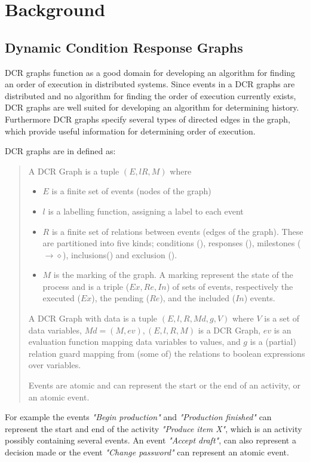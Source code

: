 \chapter{Background}\label{chap:background}
	\section{Dynamic Condition Response Graphs}
	DCR graphs function as a good domain for developing an algorithm for finding an order of execution in distributed systems. Since events in a DCR graphs are distributed and no algorithm for finding the order of execution currently exists, DCR graphs are well suited for developing an algorithm for determining history. 
	Furthermore DCR graphs specify several types of directed edges in the graph, which provide useful information for determining order of execution.
	
	\newpar DCR graphs are in \cite{6975351} defined as: 
		\begin{quotation}	
		A DCR Graph is a tuple $(E, l R, M)$ where
		\begin{itemize}
			\item $E$ is a finite set of events (nodes of the graph)
			\item $l$ is a labelling function, assigning a label to each event
			\item $R$ is a finite set of relations between events (edges of the graph). These are partitioned into five kinds; conditions (\condition), responses (\response), milestones ($\rightarrow\!\!\!\diamond$), inclusions(\inclusion) and exclusion (\exclusion).
			\item $M$ is the marking of the graph. A marking represent the state of the process and is a triple ($Ex,Re,In$) of sets of events, respectively the executed ($Ex$), the pending ($Re$), and the included ($In$) events.
		\end{itemize}
		A DCR Graph with data is a tuple $(E,l,R,Md,g,V)$ where $V$ is a set of data variables, $Md = (M,ev), (E,l,R,M)$ is a DCR Graph, $ev$ is an evaluation function mapping data variables to values, and $g$ is a (partial) relation guard mapping from (some of) the relations to boolean expressions over variables.
		
		Events are atomic and can represent the start or the end of an activity, or an atomic event. 
	\end{quotation}
	
	\newpar For example the events \textit{"Begin production"} and \textit{"Production finished"} can represent the start and end of the activity \textit{"Produce item X"}, which is an activity possibly containing several events. An event \textit{"Accept draft"}, can also represent a decision made or the event \textit{"Change password"} can represent an atomic event.
	
